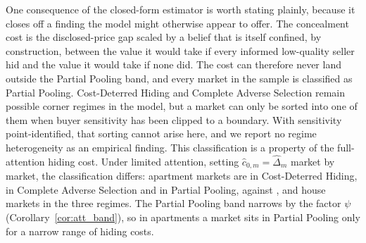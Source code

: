 One consequence of the closed-form estimator is worth stating plainly, because it closes off a
finding the model might otherwise appear to offer. The concealment cost is the disclosed-price
gap scaled by a belief that is itself confined, by construction, between the value it would take
if every informed low-quality seller hid and the value it would take if none did. The cost can
therefore never land outside the Partial Pooling band, and every market in the sample is
classified as Partial Pooling. Cost-Deterred Hiding and Complete Adverse Selection remain
possible corner regimes in the model, but a market can only be sorted into one of them when
buyer sensitivity has been clipped to a boundary. With sensitivity point-identified, that
sorting cannot arise here, and we report no regime heterogeneity as an empirical finding. This classification is a property of the full-attention hiding cost. Under limited attention, setting $\hat c_{0,m}=\hat\Delta_m$ market by market, the classification differs: \attRawNCdApt{} apartment markets are in Cost-Deterred Hiding, \attRawNCasApt{} in Complete Adverse Selection and \attRawNPpApt{} in Partial Pooling, against \attRawNCdHouse{}, \attRawNCasHouse{} and \attRawNPpHouse{} house markets in the three regimes. The Partial Pooling band narrows by the factor $\psi$ (Corollary~\ref{cor:att_band}), so in apartments a market sits in Partial Pooling only for a narrow range of hiding costs.
